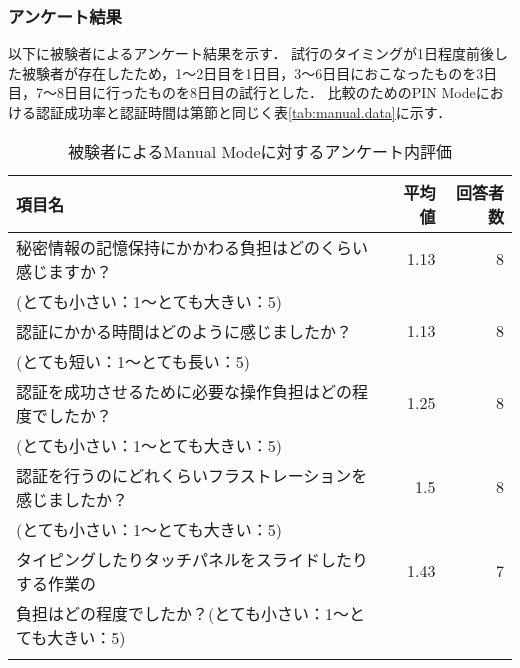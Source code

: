 \subsubsection{アンケート結果}
以下に被験者によるアンケート結果を示す．
試行のタイミングが1日程度前後した被験者が存在したため，1〜2日目を1日目，3〜6日目におこなったものを3日目，7〜8日目に行ったものを8日目の試行とした．
比較のためのPIN Modeにおける認証成功率と認証時間は第\label{sec:vsManual}節と同じく表\ref{tab:manual.data}に示す．
\begin{table}[t]
  \caption{被験者によるManual Modeに対するアンケート内評価}
  \label{tab:manual.enquete}
  \begin{center}
    \small
    \begin{tabular}{lrr}
      \bhline
      項目名 & 平均値 & 回答者数 \\ \hline
      秘密情報の記憶保持にかかわる負担はどのくらい感じますか？ & 1.13 & 8 \\
      (とても小さい：1〜とても大きい：5) & & \\
      認証にかかる時間はどのように感じましたか？ & 1.13 & 8 \\
      (とても短い：1〜とても長い：5) & & \\
      認証を成功させるために必要な操作負担はどの程度でしたか？ & 1.25 & 8 \\
      (とても小さい：1〜とても大きい：5) & & \\
      認証を行うのにどれくらいフラストレーションを感じましたか？ & 1.5 & 8 \\
      (とても小さい：1〜とても大きい：5) & & \\
      タイピングしたりタッチパネルをスライドしたりする作業の & 1.43 & 7 \\
      負担はどの程度でしたか？(とても小さい：1〜とても大きい：5) & & \\
      \bhline
    \end{tabular}
  \end{center}
\end{table}
